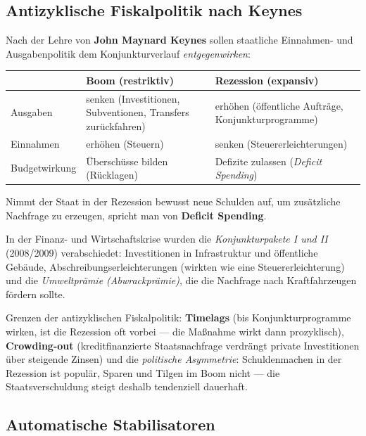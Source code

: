 \documentclass[11pt, a4paper]{article}
\begin{document}
\subsection{Antizyklische Fiskalpolitik nach Keynes}

Nach der Lehre von \textbf{John Maynard Keynes} sollen staatliche Einnahmen- und
Ausgabenpolitik dem Konjunkturverlauf \emph{entgegenwirken}:

\begin{center}
\begin{tabular}{p{3.2cm} p{5.2cm} p{5.2cm}}
\toprule
 & \textbf{Boom (restriktiv)} & \textbf{Rezession (expansiv)}\\
\midrule
Ausgaben & senken (Investitionen, Subventionen, Transfers zurückfahren) & erhöhen (öffentliche Aufträge, Konjunkturprogramme)\\
Einnahmen & erhöhen (Steuern) & senken (Steuererleichterungen)\\
Budgetwirkung & Überschüsse bilden (Rücklagen) & Defizite zulassen (\emph{Deficit Spending})\\
\bottomrule
\end{tabular}
\end{center}

Nimmt der Staat in der Rezession bewusst neue Schulden auf, um zusätzliche Nachfrage zu
erzeugen, spricht man von \textbf{Deficit Spending}.

\begin{beispiel}
In der Finanz- und Wirtschaftskrise wurden die \emph{Konjunkturpakete I und II} (2008/2009)
verabschiedet: Investitionen in Infrastruktur und öffentliche Gebäude,
Abschreibungserleichterungen (wirkten wie eine Steuererleichterung) und die
\emph{Umweltprämie (Abwrackprämie)}, die die Nachfrage nach Kraftfahrzeugen fördern sollte.
\end{beispiel}

\begin{achtung}
Grenzen der antizyklischen Fiskalpolitik: \textbf{Timelags} (bis Konjunkturprogramme
wirken, ist die Rezession oft vorbei --- die Maßnahme wirkt dann prozyklisch),
\textbf{Crowding-out} (kreditfinanzierte Staatsnachfrage verdrängt private Investitionen
über steigende Zinsen) und die \emph{politische Asymmetrie}: Schuldenmachen in der
Rezession ist populär, Sparen und Tilgen im Boom nicht --- die Staatsverschuldung steigt
deshalb tendenziell dauerhaft.
\end{achtung}

\subsection{Automatische Stabilisatoren}
\end{document}
